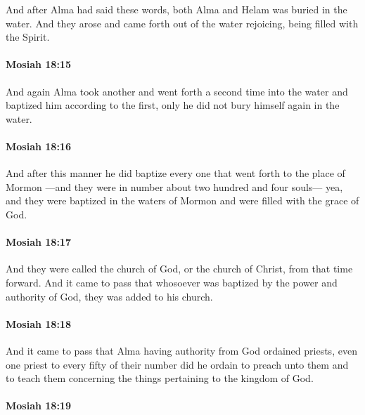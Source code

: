 			And after Alma had said these words,
			both Alma and Helam was buried in the water.
			And they arose and came forth out of the water rejoicing,
			being filled with the Spirit.

		\paragraph{Mosiah 18:15} %
			\label{MOSIAH-18-15}

			And again Alma took another
			and went forth a second time into the water
			and baptized him according to the first,
			only he did not bury himself again in the water.

		\paragraph{Mosiah 18:16} %
			\label{MOSIAH-18-16}

			And after this manner he did baptize every one
			that went forth to the place of Mormon
			---and they were in number about two hundred and four souls---
			yea, and they were baptized in the waters of Mormon
			and were filled with the grace of God.

		\paragraph{Mosiah 18:17} %
			\label{MOSIAH-18-17}

			And they were called the church of God, or the church of Christ,
			from that time forward.
			And it came to pass that
			whosoever was baptized by the power and authority of God,
			they was added to his church.

		\paragraph{Mosiah 18:18} %
			\label{MOSIAH-18-18}

			And it came to pass that Alma having authority from God ordained priests,
			even one priest to every fifty of their number did he ordain to preach unto them
			and to teach them concerning the things pertaining to the kingdom of God.

		\paragraph{Mosiah 18:19} %
			\label{MOSIAH-18-19}

